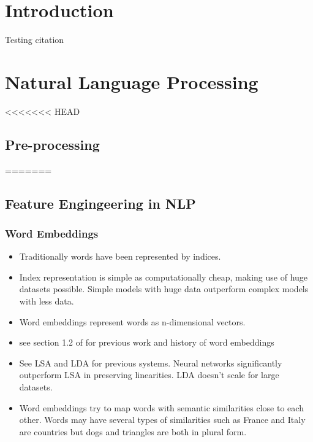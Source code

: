 \documentclass[12pt,a4paper,english
]{tutthesis}
\begin{document}
\if@twoside
\cleardoublepage
\fi

\setcounter{page}{1} %
\renewcommand{\chaptername}{} %


\chapter{Introduction}
\label{ch:intro}
Testing citation \cite{Andor2016}


\chapter{Natural Language Processing}
\label{ch:natural_language_processing}

<<<<<<< HEAD
\section{Pre-processing}
\label{ch:pre-processing}
=======
\section{Feature Engingeering in NLP}
\label{ch:feature_engineering_in_nlp}

\subsection{Word Embeddings}
\begin{itemize}
\item Traditionally words have been represented by indices. \cite{Mikolov2013}
\item Index representation is simple as computationally cheap, making use of huge datasets possible. Simple models with huge data outperform complex models with less data. \cite{Mikolov2013}
\item Word embeddings represent words as n-dimensional vectors. \cite{Mikolov2013}
\item see section 1.2 of \cite{Mikolov2013} for previous work and history of word embeddings
\item See LSA and LDA for previous systems. Neural networks significantly outperform LSA in preserving linearities. LDA doesn't scale for large datasets. \cite{Mikolov2013}
\item Word embeddings try to map words with semantic similarities close to each other. Words may have several types of similarities such as France and Italy are countries but dogs and triangles are both in plural form. \cite{Mikolov2013a}
\end{itemize}
\end{document}

